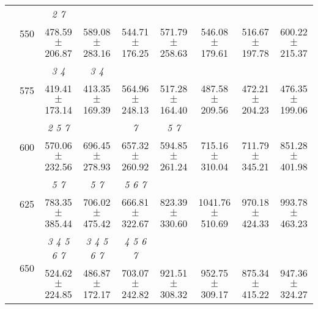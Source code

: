 \begin{table}[h]
{\begin{tabular}{
        ccccccccc}
 & \multirow{2}{*}{550}& \textit{ 2 7 }& & & & & &  \\ 
 & & 478.59 $\pm$ 206.87& 589.08 $\pm$ 283.16& 544.71 $\pm$ 176.25& 571.79 $\pm$ 258.63& 546.08 $\pm$ 179.61& 516.67 $\pm$ 197.78& 600.22 $\pm$ 215.37 \\ 
 & \multirow{2}{*}{575}& \cellcolor[HTML]{EFEFEF} \textit{ 3 4 }& \cellcolor[HTML]{EFEFEF} \textit{ 3 4 }& \cellcolor[HTML]{EFEFEF} & \cellcolor[HTML]{EFEFEF} & \cellcolor[HTML]{EFEFEF} & \cellcolor[HTML]{EFEFEF} & \cellcolor[HTML]{EFEFEF}  \\ 
 & & \cellcolor[HTML]{EFEFEF} 419.41 $\pm$ 173.14& \cellcolor[HTML]{EFEFEF} 413.35 $\pm$ 169.39& \cellcolor[HTML]{EFEFEF} 564.96 $\pm$ 248.13& \cellcolor[HTML]{EFEFEF} 517.28 $\pm$ 164.40& \cellcolor[HTML]{EFEFEF} 487.58 $\pm$ 209.56& \cellcolor[HTML]{EFEFEF} 472.21 $\pm$ 204.23& \cellcolor[HTML]{EFEFEF} 476.35 $\pm$ 199.06 \\ 
 & \multirow{2}{*}{600}& \textit{ 2 5 7 }& & \textit{ 7 }& \textit{ 5 7 }& & &  \\ 
 & & 570.06 $\pm$ 232.56& 696.45 $\pm$ 278.93& 657.32 $\pm$ 260.92& 594.85 $\pm$ 261.24& 715.16 $\pm$ 310.04& 711.79 $\pm$ 345.21& 851.28 $\pm$ 401.98 \\ 
 & \multirow{2}{*}{625}& \cellcolor[HTML]{EFEFEF} \textit{ 5 7 }& \cellcolor[HTML]{EFEFEF} \textit{ 5 7 }& \cellcolor[HTML]{EFEFEF} \textit{ 5 6 7 }& \cellcolor[HTML]{EFEFEF} & \cellcolor[HTML]{EFEFEF} & \cellcolor[HTML]{EFEFEF} & \cellcolor[HTML]{EFEFEF}  \\ 
 & & \cellcolor[HTML]{EFEFEF} 783.35 $\pm$ 385.44& \cellcolor[HTML]{EFEFEF} 706.02 $\pm$ 475.42& \cellcolor[HTML]{EFEFEF} 666.81 $\pm$ 322.67& \cellcolor[HTML]{EFEFEF} 823.39 $\pm$ 330.60& \cellcolor[HTML]{EFEFEF} 1041.76 $\pm$ 510.69& \cellcolor[HTML]{EFEFEF} 970.18 $\pm$ 424.33& \cellcolor[HTML]{EFEFEF} 993.78 $\pm$ 463.23 \\ 
 & \multirow{2}{*}{650}& \textit{ 3 4 5 6 7 }& \textit{ 3 4 5 6 7 }& \textit{ 4 5 6 7 }& & & &  \\ 
 & & 524.62 $\pm$ 224.85& 486.87 $\pm$ 172.17& 703.07 $\pm$ 242.82& 921.51 $\pm$ 308.32& 952.75 $\pm$ 309.17& 875.34 $\pm$ 415.22& 947.36 $\pm$ 324.27 \\ \midrule 

        \bottomrule
        \end{tabular}%
        }

        \end{table}
        
